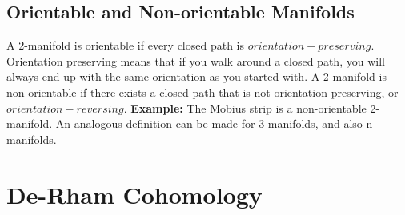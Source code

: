 \documentclass[a4paper]{article}
\begin{document}
\subsection{Orientable and Non-orientable Manifolds}
A 2-manifold is orientable if every closed path is $orientation-preserving$. Orientation preserving means that if you walk around a closed path, you will always end up with the same orientation as you started with. A 2-manifold is non-orientable if there exists a closed path that is not orientation preserving, or $orientation-reversing$. \textbf{Example:} The Mobius strip is a non-orientable 2-manifold. An analogous definition can be made for 3-manifolds, and also n-manifolds.


\section{De-Rham Cohomology}    
\end{document}
